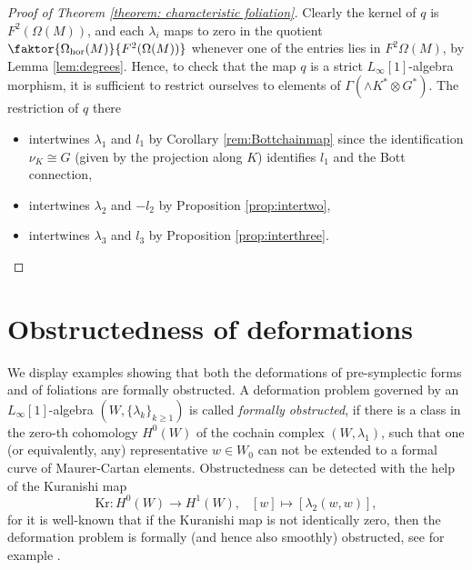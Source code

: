 \documentclass[11pt,thmsa]{amsart}
\theoremstyle{definition}
\newcommand{\hor}{\mathrm{hor}}
\begin{document}
 


\begin{proof}[Proof of Theorem \ref{theorem: characteristic foliation}]
Clearly the kernel of $q$ is $F^2(\Omega(M))$, and
 each $\lambda_i$ maps to zero in the quotient $\faktor{\Omega_\hor(M)}{F^2(\Omega(M))}$ whenever one of the entries lies in 
$F^2\Omega(M)$, by  Lemma \ref{lem:degrees}. Hence, to check that the map 
$q$ is a strict $L_{\infty}[1]$-algebra morphism,
it is sufficient to restrict ourselves to elements of $\Gamma(\wedge K^*\otimes G^*)$. The restriction of $q$ there 
\begin{itemize}
\item intertwines $\lambda_1$ and $l_1$  by Corollary \ref{rem:Bottchainmap} since    the identification $\nu_K\cong G$  (given by the projection along $K$) identifies $l_1$ and the Bott connection,
\item  intertwines $\lambda_2$ and $-l_2$ by Proposition \ref{prop:intertwo}, 
\item intertwines $\lambda_3$ and $l_3$ by Proposition \ref{prop:interthree}.
\end{itemize}
 \end{proof}
 
 

  





 



\section{\textsf{Obstructedness of deformations}}
\label{section: obstructions}


We display examples showing that both the deformations of pre-symplectic forms and of foliations are formally obstructed. A deformation problem governed by an $L_{\infty}[1]$-algebra $(W,\{\lambda_k\}_{k\ge 1})$ is called {\em formally obstructed}, if there is a class in the zero-th cohomology $H^0(W)$ of the cochain complex $(W,\lambda_1)$, such that one (or equivalently, any) representative $w\in W_0$ can not be extended to a formal curve of Maurer-Cartan elements.  
Obstructedness can be detected with the help of the Kuranishi map
\begin{equation}
\mathrm{Kr} \colon H^0(W)  \to H^1(W), \;\;\ [w]\mapsto [\lambda_2(w,w)],
\end{equation}
for it is well-known that if the Kuranishi map is not identically zero, then the deformation problem is formally (and hence also smoothly) obstructed, see for example \cite[Theorem 11.4]{OP}.
\end{document}
